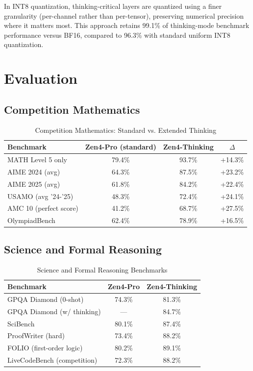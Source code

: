 \documentclass[11pt,a4paper]{article}
\begin{document}
In INT8 quantization, thinking-critical layers are quantized using a finer granularity
(per-channel rather than per-tensor), preserving numerical precision where it matters most.
This approach retains 99.1\% of thinking-mode benchmark performance versus BF16,
compared to 96.3\% with standard uniform INT8 quantization.

\section{Evaluation}

\subsection{Competition Mathematics}

\begin{table}[H]
\centering
\begin{tabular}{lccc}
\toprule
\textbf{Benchmark} & \textbf{Zen4-Pro (standard)} & \textbf{Zen4-Thinking} & \textbf{$\Delta$} \\
\midrule
MATH Level 5 only    & 79.4\% & 93.7\% & +14.3\% \\
AIME 2024 (avg)      & 64.3\% & 87.5\% & +23.2\% \\
AIME 2025 (avg)      & 61.8\% & 84.2\% & +22.4\% \\
USAMO (avg '24-'25)  & 48.3\% & 72.4\% & +24.1\% \\
AMC 10 (perfect score)& 41.2\% & 68.7\% & +27.5\% \\
OlympiadBench        & 62.4\% & 78.9\% & +16.5\% \\
\bottomrule
\end{tabular}
\caption{Competition Mathematics: Standard vs. Extended Thinking}
\end{table}

\subsection{Science and Formal Reasoning}

\begin{table}[H]
\centering
\begin{tabular}{lcc}
\toprule
\textbf{Benchmark} & \textbf{Zen4-Pro} & \textbf{Zen4-Thinking} \\
\midrule
GPQA Diamond (0-shot)        & 74.3\% & 81.3\% \\
GPQA Diamond (w/ thinking)   & ---    & 84.7\% \\
SciBench                     & 80.1\% & 87.4\% \\
ProofWriter (hard)           & 73.4\% & 88.2\% \\
FOLIO (first-order logic)    & 80.2\% & 89.1\% \\
LiveCodeBench (competition)  & 72.3\% & 88.2\% \\
\bottomrule
\end{tabular}
\caption{Science and Formal Reasoning Benchmarks}
\end{table}
\end{document}
